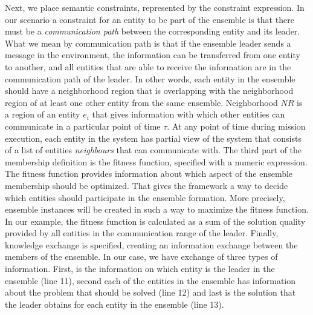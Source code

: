 \documentclass[journal]{IEEEtran}
\theoremstyle{definition}
\begin{document}
Next, we place semantic constraints, represented by the constraint expression. In our scenario a constraint for an entity to be part of the ensemble is that there must be a \textit{communication path} between the corresponding entity and its leader. What we mean by communication path is that if the ensemble leader sends a message in the environment, the information can be transferred from one entity to another, and all entities that are able to receive the information are in the communication path of the leader.
In other words, each entity in the ensemble should have a neighborhood region that is overlapping with the neighborhood region 
of at least one other entity from the same ensemble. Neighborhood $NR$ is a region of an entity $e_i$ that gives information with which other entities can communicate in a particular point of time $\tau$. At any point of time during mission execution, each entity in the system has partial view of the system that consists of a list of entities \textit{neighbours} that can communicate with. 
The third part of the membership definition is the fitness function, specified with a numeric expression. The fitness function provides information about which aspect of the ensemble membership should be optimized. That gives the framework a way to decide which entities should participate in the ensemble formation. More precisely, ensemble instances will be created in such a way to maximize the fitness function. In our example, the fitness function is calculated as a sum of the solution quality provided by all entities in the communication range of the leader. Finally, knowledge exchange is specified, creating an information exchange between the members of the ensemble. In our case, we have exchange of three types of information. First, is the information on which entity is the leader in the ensemble (line 11), second each of the entities in the ensemble has information about the problem that should be solved (line 12) and last is the solution that the leader obtains 
for each entity in the ensemble (line 13). 
\end{document}
